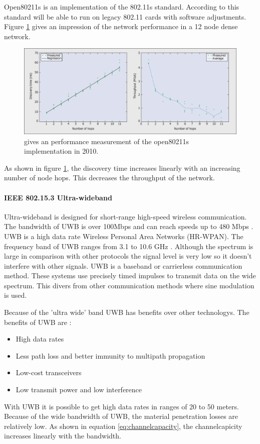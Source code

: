 \documentclass[10pt,a4paper]{article}
\begin{document}
Open80211s is an implementation of the 802.11s standard. According to \cite{ieee80211sthewlanmeshstandard} this standard will be able to run on legacy 802.11 cards with software adjustments. Figure \ref{fig:open80211s} gives an impression of the network performance in a 12 node dense network. 
\begin{figure}[H]
   \centering
   \includegraphics[width=1\textwidth]{open80211s}
   \caption{\cite{ieee80211sthewlanmeshstandard} gives an performance measurement of the open80211s implementation in 2010.}
   \label{fig:open80211s}
\end{figure}
As shown in figure \ref{fig:open80211s}, the discovery time increases linearly with an increasing number of node hops. This decreases the throughput of the network.

\paragraph{IEEE 802.15.3 Ultra-wideband}
Ultra-wideband is designed for short-range high-speed wireless communication. The bandwidth of UWB is over 100Mbps and can reach speeds up to 480 Mbps \cite{comparitivestudywirelessprotocols}. UWB is a high data rate Wireless Personal Area Networks (HR-WPAN). The frequency band of UWB ranges from 3.1 to 10.6 GHz \cite{ultrawidebandwirelesscommunications}. Although the spectrum is large in comparison with other protocols the signal level is very low so it doesn't interfere with other signals. UWB is a baseband or carrierless communication method. These systems use precisely timed impulses to transmit data on the wide spectrum. This divers from other communication methods where sine modulation is used. \cite{Bluetoothwifisurveyandcomparison}

Because of the 'ultra wide' band UWB has benefits over other technologys. The benefits of UWB are \cite{ultrawidebandwirelesscommunications}\cite{combook}: 
\begin{itemize}
\setlength\itemsep{0em}
    \item High data rates
    \item Less path loss and better immunity to multipath propagation
    \item Low-cost transceivers
    \item Low transmit power and low interference
\end{itemize}
 With UWB it is possible to get high data rates in ranges of 20 to 50 meters. Because of the wide bandwidth of UWB, the material penetration losses are relatively low. As shown in equation \ref{eq:channelcapacity}, the channelcapicity increases linearly with the bandwidth.
\end{document}
